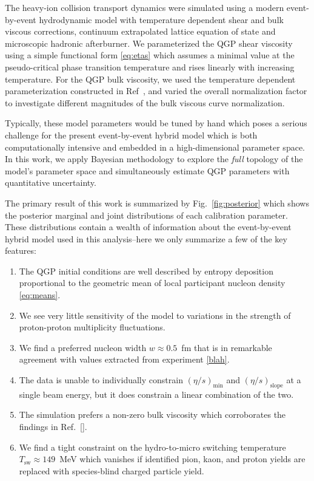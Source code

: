 \documentclass[aps,prc,reprint,amsmath,nofootinbib,superscriptaddress]{revtex4-1}
\begin{document}
The heavy-ion collision transport dynamics were simulated using a modern event-by-event hydrodynamic model with temperature dependent shear and bulk viscous corrections, continuum extrapolated lattice equation of state and microscopic hadronic afterburner. We parameterized the QGP shear viscosity using a simple functional form \eqref{eq:etas} which assumes a minimal value at the pseudo-critical phase transition temperature and rises linearly with increasing temperature. For the QGP bulk viscosity, we used the temperature dependent parameterization constructed in Ref~\cite{Denicol:2009am, Ryu:2015vwa}, and varied the overall normalization factor to investigate different magnitudes of the bulk viscous curve normalization.

Typically, these model parameters would be tuned by hand which poses a serious challenge for the present event-by-event hybrid model which is both computationally intensive and embedded in a high-dimensional parameter space. In this work, we apply Bayesian methodology to explore the \emph{full} topology of the model's parameter space and simultaneously estimate QGP parameters with quantitative uncertainty.

The primary result of this work is summarized by Fig.~\ref{fig:posterior} which shows the posterior marginal and joint distributions of each calibration parameter. These distributions contain a wealth of information about the event-by-event hybrid model used in this analysis--here we only summarize a few of the key features:
\begin{enumerate}
    \item The QGP initial conditions are well described by entropy deposition proportional to the geometric mean of local participant nucleon density \eqref{eq:means}.
    \item We see very little sensitivity of the model to variations in the strength of proton-proton multiplicity fluctuations.
    \item We find a preferred nucleon width $w\approx0.5$~fm that is in remarkable agreement with values extracted from experiment \ref{blah}.
    \item The data is unable to individually constrain $(\eta/s)_\text{min}$ and $(\eta/s)_\text{slope}$ at a single beam energy, but it does constrain a linear combination of the two.
    \item The simulation prefers a non-zero bulk viscosity which corroborates the findings in Ref.~\ref{}.
    \item We find a tight constraint on the hydro-to-micro switching temperature ${T_\text{sw} \approx 149}$~MeV which vanishes if identified pion, kaon, and proton yields are replaced with species-blind charged particle yield.
\end{enumerate}
\end{document}
